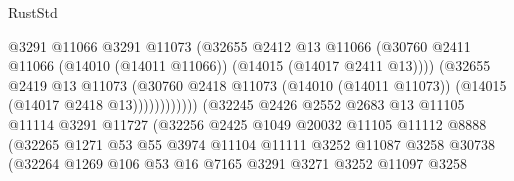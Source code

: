 \begin{lexlean}{RustStd}
\begin{coremodule}
                                          @3291
                                          @11066
                                          @3291
                                          @11073
                                          (@32655
                                            @2412
                                            @13
                                            @11066
                                            (@30760
                                              @2411
                                              @11066
                                              (@14010 (@14011 @11066))
                                              (@14015 (@14017 @2411 @13))))
                                          (@32655
                                            @2419
                                            @13
                                            @11073
                                            (@30760
                                              @2418
                                              @11073
                                              (@14010 (@14011 @11073))
                                              (@14015 (@14017 @2418 @13))))))))))))
                          (@32245
                            @2426
                            @2552
                            @2683
                            @13
                            @11105
                            @11114
                            @3291
                            @11727
                            (@32256
                              @2425
                              @1049
                              @20032
                              @11105
                              @11112
                              @8888
                              (@32265
                                @1271
                                @53
                                @55
                                @3974
                                @11104
                                @11111
                                @3252
                                @11087
                                @3258
                                @30738
                                (@32264
                                  @1269
                                  @106
                                  @53
                                  @16
                                  @7165
                                  @3291
                                  @3271
                                  @3252
                                  @11097
                                  @3258

\end{coremodule}
\end{lexlean}
